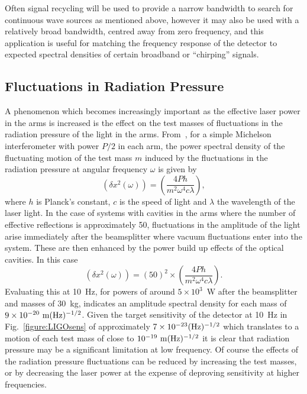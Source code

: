 \documentclass{article}
\begin{document}
Often signal recycling will be used to provide a narrow bandwidth to
search for continuous wave sources as mentioned above, however it may
also be used with a relatively broad bandwidth, centred away from
zero frequency, and this application is useful for matching the
frequency response of the detector to expected spectral densities of
certain broadband or ``chirping'' signals.


\subsection{Fluctuations in Radiation Pressure}
\label{subsection:radpress}

A phenomenon which becomes increasingly important as the effective
laser power in the arms is increased is the effect on the test masses
of fluctuations in the radiation pressure of the light in the
arms. From~\cite{Edelstein}, for a simple Michelson interferometer
with power $P/2$ in each arm, the power spectral density of the
fluctuating motion of the test mass $m$ induced by the fluctuations in
the radiation pressure at angular frequency $\omega$ is given by
%
\begin{equation}
  (\delta x^2(\omega)) = \left(\frac{4Ph}{m^2 \omega^{4} c
  \lambda}\right),
  \label{equation:radiation1}
\end{equation}
%
where $h$ is Planck's constant, $c$ is the speed of light and
$\lambda$ the wavelength of the laser light. In the case of systems
with cavities in the arms where the number of effective reflections is
approximately 50, fluctuations in the amplitude of the light arise
immediately after the beamsplitter where vacuum fluctuations enter
into the system. These are then enhanced by the power build up effects
of the optical cavities. In this case 
%
\begin{equation}
  (\delta x^2(\omega)) = (50)^2 \times \left(\frac{4Ph}{m^2 \omega^{4} c
  \lambda}\right).
  \label{equation:radiation2}
\end{equation}
%
Evaluating this at 10~Hz, for powers of around $5 \times 10^3$~W
after the beamsplitter and masses of 30~kg, indicates an amplitude
spectral density for each mass of $9 \times 10^{-20} {\rm 
\ m}(\rm Hz)^{-1/2}$. Given the target sensitivity of the detector at
10~Hz in Fig.~\ref{figure:LIGOsens} of approximately $7 \times
10^{-23}(\rm Hz)^{-1/2}$ which translates to a motion of each test mass
of close to $10^{-19} {\rm \ m}(\rm Hz)^{-1/2}$ it is clear that
radiation pressure may be a significant limitation at low
frequency. Of course the effects of the radiation pressure
fluctuations can be reduced by increasing the test masses, or by
decreasing the laser power at the expense of deproving sensitivity at
higher frequencies.
        
\end{document}
